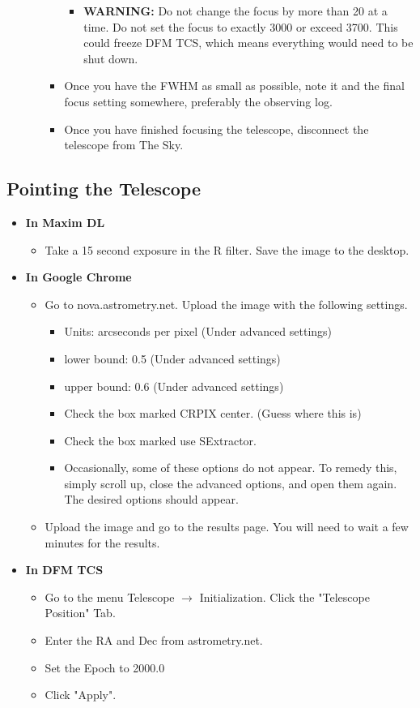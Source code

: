 \documentclass[letterpaper, 12pt]{report}
\begin{document}
\begin{itemize}
\begin{itemize}
\begin{itemize}
			\begin{itemize}
				\item \large \textbf{WARNING:} Do not change the focus by more than 20 at a time. Do not set the focus to exactly 3000 or exceed 3700. This could freeze DFM TCS, which means everything would need to be shut down.
			\end{itemize}
			\item Once you have the FWHM as small as possible, note it and the final focus setting somewhere, preferably the observing log.
			\item Once you have finished focusing the telescope, disconnect the telescope from The Sky.
		\end{itemize}
	\end{itemize}
\end{itemize}
\subsection{Pointing the Telescope}
\begin{itemize}
	\item \large \textbf{In Maxim DL}
	\begin{itemize}
		\item Take a 15 second exposure in the R filter. Save the image to the desktop.
	\end{itemize}
	\item \large \textbf{In Google Chrome}
	\begin{itemize}
		\item Go to nova.astrometry.net. Upload the image with the following settings.
		\begin{itemize}
			\item Units: arcseconds per pixel (Under advanced settings)
			\item lower bound: 0.5 (Under advanced settings)
			\item upper bound: 0.6 (Under advanced settings)
			\item Check the box marked CRPIX center. (Guess where this is)
			\item Check the box marked use SExtractor.
			\item Occasionally, some of these options do not appear. To remedy this, simply scroll up, close the advanced options, and open them again. The desired options should appear.
		\end{itemize}
		\item Upload the image and go to the results page. You will need to wait a few minutes for the results.
	\end{itemize}
	\newpage
	\item \large \textbf{In DFM TCS}
	\begin{itemize}
		\item Go to the menu Telescope $\rightarrow$ Initialization. Click the "Telescope Position" Tab.
		\item Enter the RA and Dec from astrometry.net.
		\item Set the Epoch to 2000.0
		\item Click "Apply".
	\end{itemize}
\end{itemize}
\end{document}

